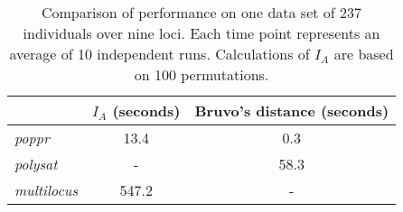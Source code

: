 \newpage

\begin{table*}
\caption{Comparison of performance on one data set of 237 individuals over nine loci. Each time point represents an average of 10 independent runs. Calculations of $I_A$ are based on 100 permutations.}
\label{table6}
\begin{tabular}{lcc}
\hline
 & \textbf{$I_A$ (seconds)} & \textbf{Bruvo's distance (seconds)} \\   
\hline
\textit{poppr} & 13.4 & 0.3 \\
\textit{polysat} & - & 58.3 \\            
\textit{multilocus} & 547.2 & - \\
\hline
\end{tabular}
\end{table*}